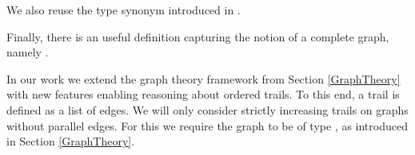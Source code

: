 \begin{isabellebody}
\begin{isamarkuptext}
\noindent We also reuse the type synonym  introduced in \mbox{}. \vspace{1em}

  \vspace{1em}

Finally, there is an useful definition capturing the notion of a complete graph, namely .%
\end{isamarkuptext}\isamarkuptrue%
%
\isadelimdocument
%
\endisadelimdocument
%
\isatagdocument
%
\isamarkuptrue%
%
\endisatagdocument
{\isafolddocument}%
%
\isadelimdocument
%
\endisadelimdocument
%
\begin{isamarkuptext}%
\label{trails} In our work we extend the graph theory framework from Section \ref{GraphTheory} 
with new features enabling reasoning about ordered trails. To this end,
 a trail is defined as a list of edges. We will only consider strictly increasing trails 
on graphs without parallel edges. For this we require the graph 
to be of type , as introduced in Section \ref{GraphTheory}. 


\end{isamarkuptext}
\end{isabellebody}
